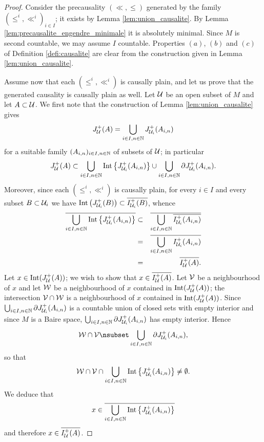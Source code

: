 \documentclass[a4paper,twoside]{article}
\begin{document}
\begin{proof}Consider the precausality $(\ll,\leq)$ generated by the family $(\leq^i,\ll^i)_{i\in I}$; it exists by Lemma \ref{lem:union_causalite}.
By Lemma \ref{lem:precausalite_engendre_minimale} it is absolutely minimal.
Since $M$ is second countable, we may assume $I$ countable.
Properties $(a)$, $(b)$ and $(c)$ of Definition \ref{defi:causalite} are clear from the construction given in Lemma \ref{lem:union_causalite}.

Assume now that each $(\leq^i,\ll^i)$ is causally plain, and let us prove that the generated causality is causally plain as well.
Let $\mathcal{U}$ be an open subset of $M$ and let $A\subset \mathcal{U}$. We first note that the construction of Lemma \ref{lem:union_causalite} gives
$$J^+_{\mathcal{U}}(A)=\bigcup_{i\in I,n\in \mathbb{N}} J^+_{\mathcal{U}_i}(A_{i,n})$$ for a suitable family $(A_{i,n})_{i\in I,n\in \mathbb{N}}$ of subsets of $\mathcal{U}$; in particular
$$ J^+_{\mathcal{U}}(A)\subset
\bigcup_{i\in I,n\in \mathbb{N}} \mathrm{Int}\left \{J^+_{\mathcal{U}_i}(A_{i,n})\right\} \cup \bigcup_{i\in I, n\in \mathbb{N}} \partial J^+_{\mathcal{U}_i}(A_{i,n}).$$
Moreover, since each $(\leq^i,\ll^i)$ is causally plain, for every $i\in I$ and every subset $B\subset \mathcal{U}_i$ we have
$\mathrm{Int}\left(J^+_{\mathcal{U}_i}(B)\right) \subset \overline{I^+_{\mathcal{U}_i}(B)}$, whence
\begin{eqnarray*}
\overline{\bigcup_{i\in I,n\in \mathbb{N}} \mathrm{Int}\left \{J^+_{\mathcal{U}_i}(A_{i,n})\right\}}   &\subset& \overline{\bigcup_{i\in I, n\in \mathbb{N}} \overline{I^+_{\mathcal{U}_i}(A_{i,n})}}\\
&=& \overline{\bigcup_{i\in I, n\in \mathbb{N}} {I^+_{\mathcal{U}_i}(A_{i,n})}}\\
&=& \overline{I^+_{\mathcal{U}}(A)}.
\end{eqnarray*}
Let $x\in \mathrm{Int}(J^+_{\mathcal{U}}(A))$; we wish to show that $x\in \overline{I^+_{\mathcal{U}}(A)}$.
Let $\mathcal V$ be a neighbourhood of $x$ and let $\mathcal W$ be a neighbourhood of $x$ contained in $\mathrm{Int}(J^+_{\mathcal{U}}(A))$;
the intersection $\mathcal V\cap \mathcal W$ is a neighbourhood of $x$ contained in $\mathrm{Int}(J^+_{\mathcal{U}}(A))$.
Since $\bigcup_{i\in I, n\in \mathbb{N}} \partial J^+_{\mathcal{U}_i}(A_{i,n})$ is a countable union of closed sets with empty interior and since
$M$ is a Baire space, $\bigcup_{i\in I, n\in \mathbb{N}} \partial J^+_{\mathcal{U}_i}(A_{i,n})$ has empty interior.
Hence $$\W\cap \V\nsubset  \bigcup_{i\in I, n\in \N} \partial J^+_{\U_i}(A_{i,n}),$$
so that $$\mathcal W\cap \mathcal V \cap \bigcup_{i\in I,n\in \mathbb{N}} \mathrm{Int}\left\{J^+_{\mathcal{U}_i}(A_{i,n})\right\}\neq \emptyset.$$
We deduce that
$$x\in  \overline{\bigcup_{i\in I,n\in \mathbb{N}} \mathrm{Int}\left\{J^+_{\mathcal{U}_i}(A_{i,n})\right\}}$$
and therefore $x\in \overline{I^+_{\mathcal{U}}(A)}$.
\end{proof}
\end{document}
